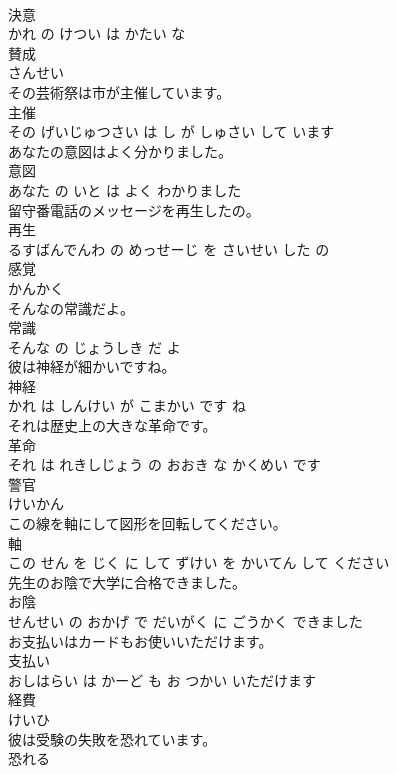 \documentclass[8pt]{extreport}
\begin{document}
\begin{CJK}{UTF8}{min}
\\	決意 
\\	かれ の けつい は かたい な		
\\	賛成	
\\	さんせい		
\\	その芸術祭は市が主催しています。	
\\	主催 
\\	その げいじゅつさい は し が しゅさい して います		
\\	あなたの意図はよく分かりました。	
\\	意図 
\\	あなた の いと は よく わかりました		
\\	留守番電話のメッセージを再生したの。	
\\	再生 
\\	るすばんでんわ の めっせーじ を さいせい した の		
\\	感覚	
\\	かんかく		
\\	そんなの常識だよ。	
\\	常識 
\\	そんな の じょうしき だ よ		
\\	彼は神経が細かいですね。	
\\	神経 
\\	かれ は しんけい が こまかい です ね		
\\	それは歴史上の大きな革命です。	
\\	革命 
\\	それ は れきしじょう の おおき な かくめい です		
\\	警官	
\\	けいかん		
\\	この線を軸にして図形を回転してください。	
\\	軸 
\\	この せん を じく に して ずけい を かいてん して ください		
\\	先生のお陰で大学に合格できました。	
\\	お陰 
\\	せんせい の おかげ で だいがく に ごうかく できました		
\\	お支払いはカードもお使いいただけます。	
\\	支払い 
\\	おしはらい は かーど も お つかい いただけます		
\\	経費	
\\	けいひ		
\\	彼は受験の失敗を恐れています。	
\\	恐れる 

\end{CJK}
\end{document}
